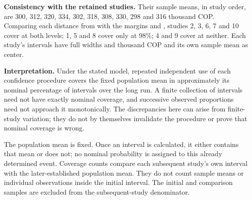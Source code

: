 \textbf{Consistency with the retained studies.} Their sample means, in study order, are 300, 312, 320, 334, 302, 318, 308, 330, 298 and 316 thousand COP. Comparing each distance from  with the margins  and , studies 2, 3, 6, 7 and 10 cover at both levels; 1, 5 and 8 cover only at 98\%; 4 and 9 cover at neither. Each study's intervals have full widths  and  thousand COP and its own sample mean as center.

\textbf{Interpretation.} Under the stated model, repeated independent use of each confidence procedure covers the fixed population mean in approximately its nominal percentage of intervals over the long run. A finite collection of intervals need not have exactly nominal coverage, and successive observed proportions need not approach it monotonically. The discrepancies here can arise from finite-study variation; they do not by themselves invalidate the procedure or prove that nominal coverage is wrong.

The population mean is fixed. Once an interval is calculated, it either contains that mean or does not; no nominal probability is assigned to this already determined event. Coverage counts compare each subsequent study's own interval with the later-established population mean. They do not count sample means or individual observations inside the initial interval. The initial and comparison samples are excluded from the subsequent-study denominator.

\secInicio[][sec:p1]

\clearpage

